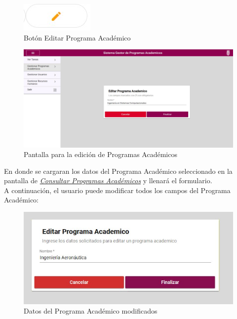         	\begin{figure}[!hbtp]
        		\centering
        		\hypertarget{editar}{\includegraphics[width=0.7\linewidth]{images/SP3/BtnEditar}}
        		\caption{Botón Editar Programa Académico}
        		\label{editar}
        	\end{figure}

        \begin{figure}[!hbtp]
        	\centering
        	\hypertarget{editarpa}{\includegraphics[width=0.7\linewidth]{images/SP3/EditarPA}}
        	\caption{Pantalla para la edición de Programas Académicos}
        	\label{editarpa}
        \end{figure}

        En donde se cargaran los datos del Programa Académico seleccionado en la pantalla de \hyperlink{consultarpa}{\textit{Consultar Programas Académicos}} y llenará el formulario.\\

        A continuación, el usuario puede modificar todos los campos del Programa Académico:
        \begin{figure}[!hbtp]
        	\centering
        	\hypertarget{modif}{\includegraphics[width=0.7\linewidth]{images/SP3/Editado}}
        	\caption{Datos del Programa Académico modificados}
        	\label{modif}
        \end{figure}

